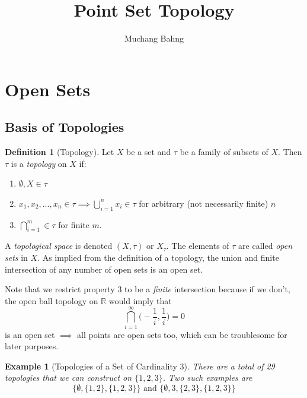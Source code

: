 \documentclass{article}
\newtheorem{example}{Example}[section]
\theoremstyle{remark}
\theoremstyle{definition}
\newtheorem{definition}{Definition}[section]
\begin{document}
\pagestyle{fancy}

\cfoot{\thepage / \pageref{LastPage}}

\title{Point Set Topology}
\author{Muchang Bahng}

\maketitle

\section{Open Sets}
\subsection{Basis of Topologies}
\begin{definition}[Topology]
Let $X$ be a set and $\tau$ be a family of subsets of $X$. Then $\tau$ is a \textit{topology} on $X$ if: 
\begin{enumerate}
    \item $\emptyset, X \in \tau$
    \item $x_1, x_2, ..., x_n \in \tau \implies \bigcup_{i = 1}^{n} x_{i} \in \tau$ for arbitrary (not necessarily finite) $n$
    \item $\bigcap_{i=1}^{m} \in \tau$ for finite $m$. 
\end{enumerate}
A \textit{topological space} is denoted $(X, \tau)$ or $X_{\tau}$. The elements of $\tau$ are called \textit{open sets} in $X$. As implied from the definition of a topology, the union and finite intersection of any number of open sets is an open set. 
\end{definition}

Note that we restrict property 3 to be a \textit{finite} intersection because if we don't, the open ball topology on $\mathbb{R}$ would imply that 
\[ \bigcap_{i = 1}^{\infty} \Big( - \frac{1}{i}, \frac{1}{i} \Big) = 0\]
is an open set $\implies$ all points are open sets too, which can be troublesome for later purposes. 

\begin{example}[Topologies of a Set of Cardinality 3]
There are a total of 29 topologies that we can construct on $\{1, 2, 3\}$. Two such examples are 
\[\{\emptyset, \{1, 2\}, \{1, 2, 3\}\} \text{ and } \{\emptyset, 3, \{2, 3\}, \{1, 2, 3\}\}\]
\end{example}
\end{document}
